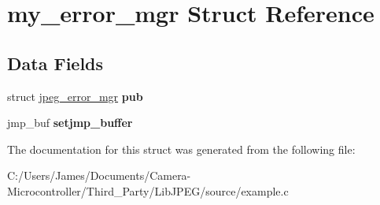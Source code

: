 \hypertarget{structmy__error__mgr}{}\section{my\+\_\+error\+\_\+mgr Struct Reference}
\label{structmy__error__mgr}
\subsection*{Data Fields}
\begin{DoxyCompactItemize}
\item 
\mbox{\label{structmy__error__mgr_a971a43fba6975522cd3cc552501f47de}} 
struct \hyperlink{structjpeg__error__mgr}{jpeg\+\_\+error\+\_\+mgr} {\bfseries pub}
\item 
\mbox{\label{structmy__error__mgr_a5be06c604b7002679fcf9aee7d417072}} 
jmp\+\_\+buf {\bfseries setjmp\+\_\+buffer}
\end{DoxyCompactItemize}


The documentation for this struct was generated from the following file\+:\begin{DoxyCompactItemize}
\item 
C\+:/\+Users/\+James/\+Documents/\+Camera-\/\+Microcontroller/\+Third\+\_\+\+Party/\+Lib\+J\+P\+E\+G/source/example.\+c\end{DoxyCompactItemize}

